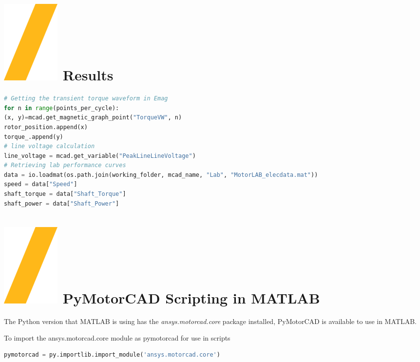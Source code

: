 \documentclass[landscape]{article}
\begin{document}
\begin{multicols}{3}
\section{\includegraphics[height=\fontcharht\font`\S]{slash.png} Results}
\begin{lstlisting}[language=Python]
# Getting the transient torque waveform in Emag 
for n in range(points_per_cycle):
(x, y)=mcad.get_magnetic_graph_point("TorqueVW", n)
rotor_position.append(x)
torque_.append(y)
# line voltage calculation
line_voltage = mcad.get_variable("PeakLineLineVoltage")
# Retrieving lab performance curves 
data = io.loadmat(os.path.join(working_folder, mcad_name, "Lab", "MotorLAB_elecdata.mat"))
speed = data["Speed"]
shaft_torque = data["Shaft_Torque"]
shaft_power = data["Shaft_Power"]
\end{lstlisting}

\section{\includegraphics[height=\fontcharht\font`\S]{slash.png} PyMotorCAD Scripting in MATLAB}
The Python version that MATLAB is using has the \textit{ansys.motorcad.core} package installed, PyMotorCAD is available to use in MATLAB.

To import the ansys.motorcad.core module as pymotorcad for use in scripts
\begin{lstlisting}[language=Python]
pymotorcad = py.importlib.import_module('ansys.motorcad.core')	
\end{lstlisting}


\end{multicols}
\end{document}
